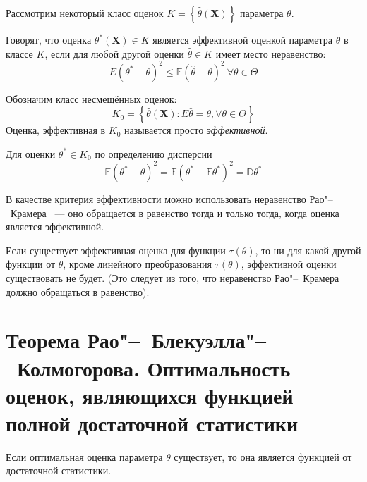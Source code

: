Рассмотрим некоторый класс оценок $K=\left\{\hat{\theta}\left(\mathbf{X}\right)\right\}$ параметра $\theta$.
\begin{defn}
    Говорят, что оценка $\theta^{*}\left(\mathbf{X}\right) \in K$ является эффективной оценкой параметра $\theta$ в классе $K$, если для любой другой оценки $\hat{\theta} \in K$ имеет место неравенство:
    \begin{equation*}
        E\left(\theta^{*}-\theta\right)^{2} \leqslant \mathbb{E}(\hat{\theta}-\theta)^{2}~ \forall \theta \in \Theta
    \end{equation*}
\end{defn}
Обозначим класс несмещённых оценок:
\begin{equation*}
    K_{0}=\left\{\hat{\theta}\left(\mathbf{X}\right): E \hat{\theta}=\theta, \forall \theta \in \Theta\right\}
\end{equation*}
Оценка, эффективная в $K_0$ называется просто {\it эффективной}.

Для оценки $\theta^{*} \in K_{0}$ по определению дисперсии
\begin{equation*}
    \mathbb{E}\left(\theta^{*}-\theta\right)^{2}=\mathbb{E}\left(\theta^{*}-\mathbb{E} \theta^{*}\right)^{2}=\mathbb{D} \theta^{*}
\end{equation*}

\begin{rmrk}
В качестве критерия эффективности можно использовать неравенство Рао"--~Крамера ~--- оно обращается в равенство тогда и только тогда, когда оценка является эффективной.

Если существует эффективная оценка для функции $\tau(\theta)$, то ни для какой другой функции от $\theta$, кроме линейного преобразования $\tau(\theta)$, эффективной оценки существовать не будет. (Это следует из того, что неравенство Рао"--~Крамера должно обращаться в равенство).
\end{rmrk}

\section{Теорема Рао"--~Блекуэлла"--~Колмогорова. Оптимальность оценок, являющихся функцией полной достаточной статистики}

\begin{namedthm} Если оптимальная оценка параметра $\theta$ существует, то она является функцией от достаточной статистики.
\end{namedthm}


